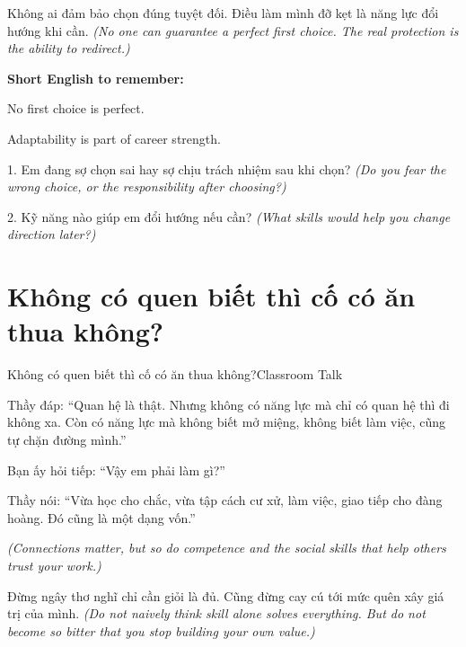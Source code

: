 \begin{baihoc}
Không ai đảm bảo chọn đúng tuyệt đối. Điều làm mình đỡ kẹt là năng lực đổi hướng khi cần.
\textit{(No one can guarantee a perfect first choice. The real protection is the ability to redirect.)}
\end{baihoc}

\begin{ghinhoanh}
\textbf{Short English to remember:}

No first choice is perfect.

Adaptability is part of career strength.
\end{ghinhoanh}

\begin{tuhocnhanh}
1. Em đang sợ chọn sai hay sợ chịu trách nhiệm sau khi chọn? \textit{(Do you fear the wrong choice, or the responsibility after choosing?)}

2. Kỹ năng nào giúp em đổi hướng nếu cần? \textit{(What skills would help you change direction later?)}
\end{tuhocnhanh}
\ngancach

\section{Không có quen biết thì cố có ăn thua không?}
\begin{truyen}{Không có quen biết thì cố có ăn thua không?}{Classroom Talk}

Thầy đáp: ``Quan hệ là thật. Nhưng không có năng lực mà chỉ có quan hệ thì đi không xa. Còn có năng lực mà không biết mở miệng, không biết làm việc, cũng tự chặn đường mình.''

Bạn ấy hỏi tiếp: ``Vậy em phải làm gì?''

Thầy nói: ``Vừa học cho chắc, vừa tập cách cư xử, làm việc, giao tiếp cho đàng hoàng. Đó cũng là một dạng vốn.''

\textit{(Connections matter, but so do competence and the social skills that help others trust your work.)}
\end{truyen}

\begin{baihoc}
Đừng ngây thơ nghĩ chỉ cần giỏi là đủ. Cũng đừng cay cú tới mức quên xây giá trị của mình.
\textit{(Do not naively think skill alone solves everything. But do not become so bitter that you stop building your own value.)}
\end{baihoc}

